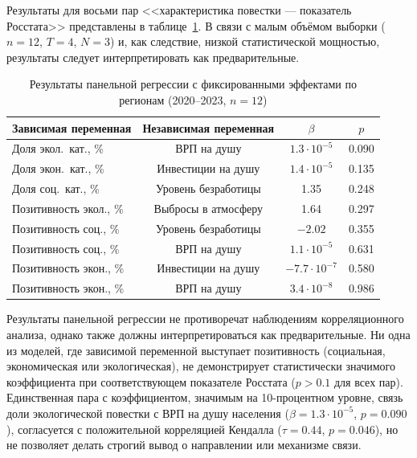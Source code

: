 \documentclass[master, och, coursework]{SCWorks1}
\begin{document}
Результаты для восьми пар <<характеристика повестки --- показатель Росстата>> представлены в таблице~\ref{tab:panel_reg}. В связи с малым объёмом выборки ($n=12$, $T=4$, $N=3$) и, как следствие, низкой статистической мощностью, результаты следует интерпретировать как предварительные.

\begin{table}[H]
\caption{Результаты панельной регрессии с фиксированными эффектами по регионам (2020--2023, $n=12$)}
\label{tab:panel_reg}
\centering
\begin{tabular}{|l|c|c|c|}
\hline
Зависимая переменная & Независимая переменная & $\beta$ & $p$ \\
\hline
Доля экол.\ кат., \%          & ВРП на душу                 & $1.3\cdot 10^{-5}$ & 0.090 \\
Доля экон.\ кат., \%          & Инвестиции на душу          & $1.4\cdot 10^{-5}$ & 0.135 \\
Доля соц.\ кат., \%           & Уровень безработицы         & 1.35  & 0.248 \\
Позитивность экол., \%        & Выбросы в атмосферу         & 1.64  & 0.297 \\
Позитивность соц., \%         & Уровень безработицы         & $-2.02$ & 0.355 \\
Позитивность соц., \%         & ВРП на душу                 & $1.1\cdot 10^{-5}$ & 0.631 \\
Позитивность экон., \%        & Инвестиции на душу          & $-7.7\cdot 10^{-7}$ & 0.580 \\
Позитивность экон., \%        & ВРП на душу                 & $3.4\cdot 10^{-8}$ & 0.986 \\
\hline
\end{tabular}
\end{table}

Результаты панельной регрессии не противоречат наблюдениям корреляционного анализа, однако также должны интерпретироваться как предварительные. Ни одна из моделей, где зависимой переменной выступает позитивность (социальная, экономическая или экологическая), не демонстрирует статистически значимого коэффициента при соответствующем показателе Росстата ($p > 0.1$ для всех пар). Единственная пара с коэффициентом, значимым на 10-процентном уровне, связь доли экологической повестки с ВРП на душу населения ($\beta = 1.3 \cdot 10^{-5}$, $p = 0.090$), согласуется с положительной корреляцией Кендалла ($\tau = 0.44$, $p = 0.046$), но не позволяет делать строгий вывод о направлении или механизме связи.
\end{document}

